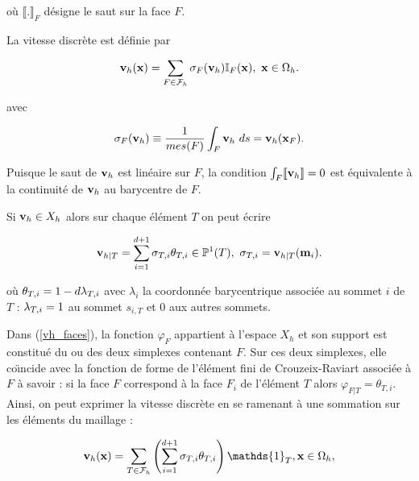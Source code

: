 \begin{appendix}
 o\`u $ \llbracket . \rrbracket _F $ d\'esigne le saut sur la face $F$.

La vitesse discr\`ete  est d\'efinie par

\begin{equation}
\label{vh_faces}
\ds{
\mbf{v}_h(\mbf{x}) = \sum _{F\in \mathcal F_h}\sigma _F(\mbf{v}_h)\mathbb I _F(\mbf{x}),\ \mbf{x}\in \Omega _h.
}
\end{equation}

avec

\begin{equation}
\ds{
\sigma _F(\mbf{v}_h) \equiv \frac{1}{mes(F)}\int _F \mathbf {v}_h\  ds=\mbf{v}_h(\mbf x _F).
}
\end{equation}

\begin{rque}
Puisque le saut de $ \mbf{v}_h $ est lin\'eaire sur $F$, la condition $\int _F  \llbracket \mbf{v}_h \rrbracket =0$ est \'equivalente \`a la continuit\'e de $ \mbf{v}_h $ au barycentre de $F$.
\end{rque}

 Si $\mbf v _h \in X_h$ alors sur chaque \'el\'ement $T$ on peut \'ecrire

\begin{equation}
\ds{
  \mbf{v}_{h\vert T} =\sum _{i=1}^{d+1} \sigma_{T,i}\theta _{T,i} \in \mathbb P^1(T),\ \sigma_{T,i}= \mbf{v}_{h\vert T} (\mbf{m}_i).
}
\end{equation}

où $ \ds{\theta _{T,i} = 1-d\lambda_{T,i}}$  avec  $\lambda _i$ la coordonn\'ee barycentrique associ\'ee au sommet  $i$ de $ T$ : $ \ds{\lambda _{T,i} = 1 }$ au sommet $s_{i,T}$ et $0$ aux autres sommets. 




Dans (\ref{vh_faces}), la fonction $\varphi _F$ appartient \`a l'espace $X_h $ et son support est constitu\'e du ou des deux simplexes contenant $F$. Sur ces deux simplexes,
elle co\"\i ncide
avec la fonction de forme de l'\'el\'ement fini de Crouzeix-Raviart associ\'ee \`a $F$ \`a savoir : si la face $F$ correspond \`a la face $F_i$ de l'\'el\'ement $T$ alors $\varphi _{F\vert T} = \theta _{T,i}$.\\
Ainsi, on peut exprimer la vitesse discr\`ete en se ramenant \`a une sommation sur les \'el\'ements du maillage :

\begin{equation}
\label{vh_elts}
\ds{
\mbf{v}_h(\mbf{x}) = \sum _{T\in \mathcal F_h} \left( \sum _{i=1}^{d+1} \sigma_{T,i} \theta _{T,i} \right) \mathds{1} _T, \mbf{x}\in \Omega _h,
}
\end{equation}







\end{appendix}
